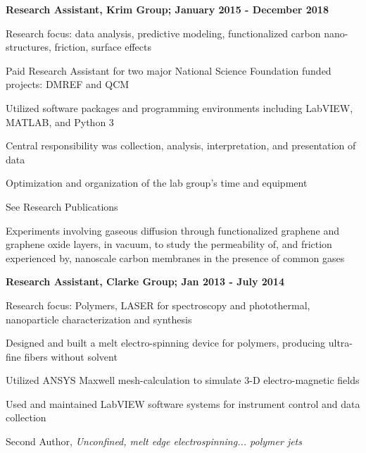 \documentclass[letterpaper,final]{memoir}
\newcommand{\Sep}{\vspace{1.0em}}
\newcommand{\SmallSep}{\vspace{0.4em}}
\newcommand{\CVItem}[1]
	{\textbf{\color{Blue} #1}}
\begin{document}
\CVItem{Research Assistant, Krim Group; January 2015 - December 2018} 
\begin{compactitem}[\color{Blue}$\circ$]
   
    \SmallSep

    \item Research focus: data analysis, predictive modeling, functionalized carbon nano-structures, friction, surface effects
    \item Paid Research Assistant for two major National Science Foundation funded projects: DMREF and QCM
    \item Utilized software packages and programming environments including LabVIEW, MATLAB, and Python 3
    \item Central responsibility was collection, analysis, interpretation, and presentation of data
    \item Optimization and organization of the lab group's time and equipment
    \item See Research Publications
    \item Experiments involving gaseous diffusion through functionalized graphene and graphene oxide layers, in vacuum,
    to study the permeability of, and friction experienced by, nanoscale carbon membranes in the presence of common gases

\end{compactitem}

\Sep

\CVItem{Research Assistant, Clarke Group; Jan 2013 - July 2014}
\begin{compactitem}[\color{Blue}$\circ$]
    
    \SmallSep

    \item Research focus: Polymers, LASER for spectroscopy and photothermal, nanoparticle characterization and synthesis
    \item Designed and built a melt electro-spinning device for polymers, producing ultra-fine fibers without solvent
    \item Utilized ANSYS Maxwell mesh-calculation to simulate 3-D electro-magnetic fields
    \item Used and maintained LabVIEW software systems for instrument control and data collection
    \item Second Author, \textit{Unconfined, melt edge electrospinning... polymer jets}

\end{compactitem}
\end{document}

